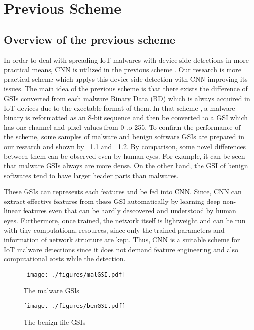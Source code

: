\chapter{Previous Scheme}\label{sec:previous_scheme}
\section{Overview of the previous scheme} 
In order to deal with spreading IoT malwares with device-side detections in more practical means, CNN is utilized in the previous scheme \cite{previous}.
Our research is more practical scheme which applys this device-side detection with CNN improving its issues.
The main idea of the previous scheme is that there exists the difference of GSIs converted from each malware Binary Data (BD) which is always acquired in IoT devices due to the exectable format of them.
In that scheme \cite{previous}, a malware binary is reformatted as an 8-bit sequence and then be converted to a GSI which has one channel and pixel values from 0 to 255.
To confirm the performance of the scheme, some samples of malware and benign software GSIs are prepared in our research and shown by \figurename~\ref{fig:malGSI} and \figurename~\ref{fig:benGSI}.
By comparison, some novel differences between them can be observed even by human eyes.
For example, it can be seen that malware GSIs always are more dense.
On the other hand, the GSI of benign softwares tend to have larger header parts than malwares.

These GSIs can represents each features and be fed into CNN.
Since, CNN can extract effective features from these GSI automatically by learning deep non-linear features even that can be hardly descovered and understood by human eyes.
Furthermore, once trained, the network itself is lightweight and can be run with tiny computational resources, since only the trained parameters and information of network structure are kept.
Thus, CNN is a suitable scheme for IoT malware detections since it does not demand feature engineering and also computational costs while the detection.

\begin{figure}[p]
 \centering
 \hspace{-55pt}
 \texttt{[image: ./figures/malGSI.pdf]}
 \caption{The malware GSIs} 
 \label{fig:malGSI}
\end{figure}
\begin{figure}[p]
 \centering
 \hspace{-55pt}
 \texttt{[image: ./figures/benGSI.pdf]}
 \caption{The benign file GSIs} 
 \label{fig:benGSI}
\end{figure}
\afterpage{\clearpage}
\newpage

